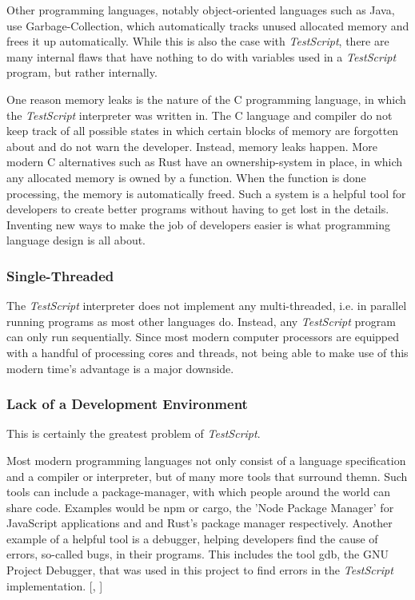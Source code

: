 \documentclass[12pt,a4paper]{article}
\newcommand{\name}{\emph{TestScript}}
\begin{document}
Other programming languages, notably object-oriented languages such as Java,
use Garbage-Collection, which automatically tracks unused allocated memory and
frees it up automatically. While this is also the case with \name{}, there are
many internal flaws that have nothing to do with variables used in a \name{}
program, but rather internally. 

One reason memory leaks is the nature of the
C programming language, in which the \name{} interpreter was written in. The C language and
compiler do not keep track of all possible states in which certain blocks of memory are
forgotten about and do not warn the developer. Instead, memory leaks happen.
More modern C alternatives such as Rust have an ownership-system in place,
in which any allocated memory is owned by a function. When the function
is done processing, the memory is automatically freed. Such a system
is a helpful tool for developers to create better programs without having to get
lost in the details.
Inventing new ways to make the job of developers easier is what programming
language design is all about.

\subsubsection{Single-Threaded}
The \name{} interpreter does not implement any multi-threaded, i.e. in parallel
running programs as most other languages do. Instead, any \name{} program can
only run sequentially. Since most modern computer processors
are equipped with a handful of processing cores and threads, not being able to
make use of this modern time's advantage is a major downside.

\subsubsection{Lack of a Development Environment}
This is certainly the greatest problem of \name{}.

Most modern programming languages not only consist
of a language specification and a compiler or interpreter, but of many more
tools that surround themn.
Such tools can include a package-manager, with which people around the world
can share code. Examples would be npm or cargo, 
the 'Node Package Manager' for JavaScript applications and and Rust's package 
manager respectively.
Another example of a helpful tool is a debugger, helping developers
find the cause of errors, so-called bugs, in their programs.
This includes the tool gdb, the GNU Project Debugger, that was used in this
project to find errors in the \name{} implementation.
[, ]
\end{document}
